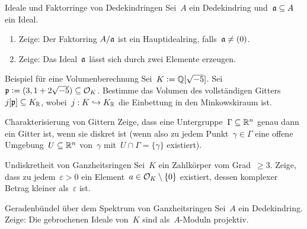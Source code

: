 \documentclass{uebblatt}
\begin{document}

\begin{aufgabe}{Ideale und Faktorringe von Dedekindringen}
Sei~$A$ ein Dedekindring und~$\mathfrak{a} \subseteq A$ ein Ideal.
\begin{enumerate}
\item Zeige: Der Faktorring $A/\mathfrak{a}$ ist ein Hauptidealring, falls~$\mathfrak{a} \neq
(0)$.
\item Zeige: Das Ideal~$\mathfrak{a}$ lässt sich durch zwei Elemente erzeugen.
\end{enumerate}
\end{aufgabe}

\begin{aufgabe}{Beispiel für eine Volumenberechnung}
Sei~$K \vcentcolon= \mathbb{Q}[\sqrt{-5}]$. Sei~$\mathfrak{p} \vcentcolon= (3, 1 + 2\sqrt{-5}) \subseteq
\mathcal{O}_K$. Bestimme das Volumen des vollständigen
Gitters~$j[\mathfrak{p}] \subseteq K_{\mathbb{R}}$, wobei~$j : K \hookrightarrow K_{\mathbb{R}}$ die
Einbettung in den Minkowskiraum ist.
\end{aufgabe}

\begin{aufgabe}{Charakterisierung von Gittern}
Zeige, dass eine Untergruppe~$\Gamma \subseteq \mathbb{R}^n$ genau dann ein Gitter
ist, wenn sie diskret ist (wenn also zu jedem Punkt~$\gamma \in \Gamma$ eine
offene Umgebung~$U \subseteq \mathbb{R}^n$ von~$\gamma$ mit~$U \cap \Gamma =
\{\gamma\}$ existiert).
\end{aufgabe}

\begin{aufgabe}{Undiskretheit von Ganzheitsringen}
Sei~$K$ ein Zahlkörper vom Grad~$\geq 3$. Zeige, dass zu jedem~$\varepsilon >
0$ ein Element~$a \in \mathcal{O}_K \setminus \{0\}$ existiert, dessen komplexer Betrag
kleiner als~$\varepsilon$ ist.
\end{aufgabe}

\begin{aufgabe*}{Geradenbündel über dem Spektrum von Ganzheitsringen}
Sei~$A$ ein Dedekindring. Zeige: Die gebrochenen Ideale von~$K$ sind
als~$A$-Moduln projektiv.
\end{aufgabe*}
\end{document}
